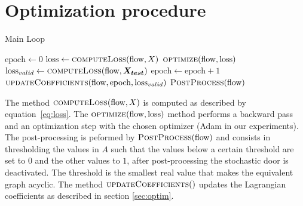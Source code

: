 \appendix
\section{Optimization procedure}\label{app:optim}
\begin{algorithm}
\begin{algorithmic} \caption{Main Loop}
\State $\text{epoch} \gets 0$
        \State $\text{loss} \gets \Call{computeLoss}{\text{flow}, X}$
        \State $\Call{optimize}{\text{flow}, \text{loss}}$
    \EndFor
   \State $\text{loss}_{valid} \gets \Call{computeLoss}{\text{flow}, \mathbf{X_{test}}}$
    \State $\text{epoch} \gets \text{epoch} + 1$
    \State $\Call{updateCoefficients}{\text{flow}, \text{epoch}, \text{loss}_{valid}}$
        \State $\Call{PostProcess}{\text{flow}}$
    \EndIf
\EndWhile
\end{algorithmic}
\end{algorithm}
The method $\Call{computeLoss}{\text{flow}, X}$ is computed as described by equation~\eqref{eq:loss}. The $\Call{optimize}{\text{flow}, \text{loss}}$ method performs a backward pass and an optimization step with the chosen optimizer (Adam in our experiments). The post-processing is peformed by $\Call{PostProcess}{\text{flow}}$ and consists in thresholding the values in $A$ such that the values below a certain threshold are set to $0$ and the other values to $1$, after post-processing the stochastic door is deactivated. The threshold is the smallest real value that makes the equivalent graph acyclic. The method $\Call{updateCoefficients}$ updates the Lagrangian coefficients as described in section \ref{sec:optim}.


